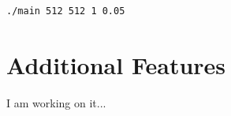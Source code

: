 \documentclass[11pt]{article}
\begin{document}
\begin{tcolorbox}[colback=white]
\begin{lstlisting}[basicstyle=\footnotesize]
./main 512 512 1 0.05
\end{lstlisting}
\end{tcolorbox}



\section{Additional Features}

I am working on it...

%
%
%
%
%
%
%
%			
%
\end{document}
